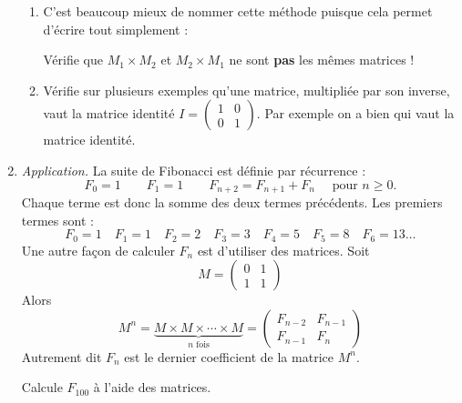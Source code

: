 \documentclass[11pt,class=report,crop=false]{standalone}
\begin{document}
\begin{activite}[Matrices]
\begin{enumerate}
\begin{enumerate}
   \item  C'est beaucoup mieux de nommer cette méthode  puisque cela permet d'écrire tout simplement :
  
  Vérifie que $M_1 \times M_2$ et $M_2 \times M_1$ ne sont \textbf{pas} les mêmes matrices !
  
  \item Vérifie sur plusieurs exemples qu'une matrice, multipliée par son inverse, vaut la matrice identité 
  $I = \begin{pmatrix}1&0\\0&1\end{pmatrix}$.
  Par exemple on a bien  qui vaut la matrice identité.

  \end{enumerate}  
  
 
 \item \emph{Application.} La suite de Fibonacci est définie par récurrence :
 $$F_0 = 1 \qquad F_1 = 1 \qquad F_{n+2} = F_{n+1}+F_n \quad \text{ pour } n \ge 0.$$
 Chaque terme est donc la somme des deux termes précédents. Les premiers termes sont :
 $$F_0 = 1 \quad F_1 = 1 \quad F_2 = 2 \quad F_3 = 3 \quad F_4 = 5 \quad F_5 = 8 \quad F_6 = 13  \ldots$$
 Une autre façon de calculer $F_n$ est d'utiliser des matrices.
 Soit 
 $$M = \begin{pmatrix}0&1\\1&1\end{pmatrix}$$
 Alors 
 $$M^n = \underbrace{M \times M \times \cdots \times M}_{n \text{ fois}} = \begin{pmatrix}
 F_{n-2}&F_{n-1}\\F_{n-1}&F_{n}\end{pmatrix}$$
 Autrement dit $F_n$ est le dernier coefficient de la matrice $M^n$.
 
 Calcule $F_{100}$ à l'aide des matrices.

\end{enumerate} 

\end{activite}


\end{document}

